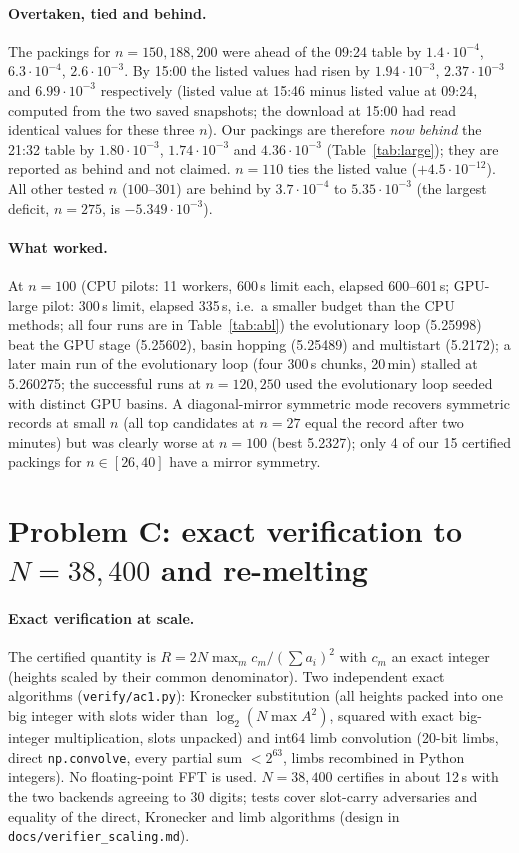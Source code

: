 \documentclass[10pt]{article}
\begin{document}
\paragraph{Overtaken, tied and behind.} The packings for $n=150,188,200$ were ahead of the 09:24 table by $1.4\cdot10^{-4}$, $6.3\cdot10^{-4}$, $2.6\cdot10^{-3}$. By 15:00 the listed values had risen by $1.94\cdot10^{-3}$, $2.37\cdot10^{-3}$ and $6.99\cdot10^{-3}$ respectively (listed value at 15:46 minus listed value at 09:24, computed from the two saved snapshots; the download at 15:00 had read identical values for these three $n$). Our packings are therefore \emph{now behind} the 21:32 table by $1.80\cdot10^{-3}$, $1.74\cdot10^{-3}$ and $4.36\cdot10^{-3}$ (Table~\ref{tab:large}); they are reported as behind and not claimed. $n=110$ ties the listed value ($+4.5\cdot10^{-12}$). All other tested $n$ ($100$--$301$) are behind by $3.7\cdot10^{-4}$ to $5.35\cdot10^{-3}$ (the largest deficit, $n=275$, is $-5.349\cdot10^{-3}$).
\paragraph{What worked.} At $n=100$ (CPU pilots: 11 workers, 600\,s limit each, elapsed 600--601\,s; GPU-large pilot: 300\,s limit, elapsed 335\,s, i.e.\ a smaller budget than the CPU methods; all four runs are in Table~\ref{tab:abl}) the evolutionary loop (5.25998) beat the GPU stage (5.25602), basin hopping (5.25489) and multistart (5.2172); a later main run of the evolutionary loop (four 300\,s chunks, 20\,min) stalled at 5.260275; the successful runs at $n=120,250$ used the evolutionary loop seeded with distinct GPU basins. A diagonal-mirror symmetric mode recovers symmetric records at small $n$ (all top candidates at $n=27$ equal the record after two minutes) but was clearly worse at $n=100$ (best 5.2327); only 4 of our 15 certified packings for $n\in[26,40]$ have a mirror symmetry.

\section{Problem C: exact verification to $N=38{,}400$ and re-melting}\label{sec:c}
\paragraph{Exact verification at scale.} The certified quantity is $R=2N\max_mc_m/(\sum a_i)^2$ with $c_m$ an exact integer (heights scaled by their common denominator). Two independent exact algorithms (\texttt{verify/ac1.py}): Kronecker substitution (all heights packed into one big integer with slots wider than $\log_2(N\max A^2)$, squared with exact big-integer multiplication, slots unpacked) and int64 limb convolution (20-bit limbs, direct \texttt{np.convolve}, every partial sum $<2^{63}$, limbs recombined in Python integers). No floating-point FFT is used. $N=38{,}400$ certifies in about 12\,s with the two backends agreeing to 30 digits; tests cover slot-carry adversaries and equality of the direct, Kronecker and limb algorithms (design in \texttt{docs/verifier\_scaling.md}).
\end{document}

